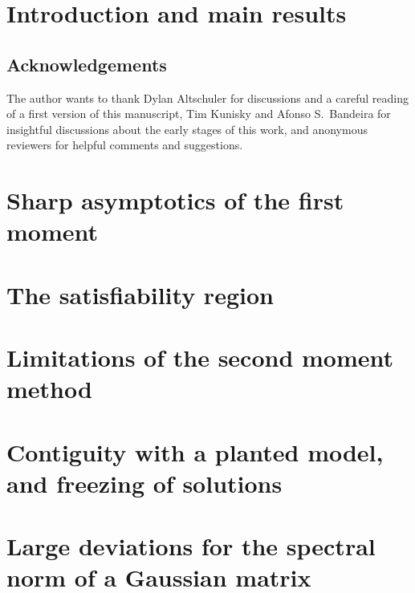\documentclass[a4paper,11pt]{article}
\begin{document}
\newpage
\setcounter{tocdepth}{2}
\tableofcontents

\newpage
\section{Introduction and main results}\label{sec:intro}


\subsection*{Acknowledgements}
The author wants to thank Dylan Altschuler for discussions and a careful reading of a first version of this manuscript, 
Tim Kunisky and Afonso S.\ Bandeira for insightful discussions about the early stages of this work, 
and anonymous reviewers for helpful comments and suggestions.

\section{Sharp asymptotics of the first moment}\label{sec:1st_moment}


\section{The satisfiability region}\label{sec:2nd_moment}


\section{Limitations of the second moment method}\label{sec:fail_2nd_moment}


\printbibliography

\newpage
\appendix 
{} %

\section{Contiguity with a planted model, and freezing of solutions}\label{sec:appendix_freezing}


\section{Large deviations for the spectral norm of a Gaussian matrix}\label{sec:appendix_ldp}

\end{document}
